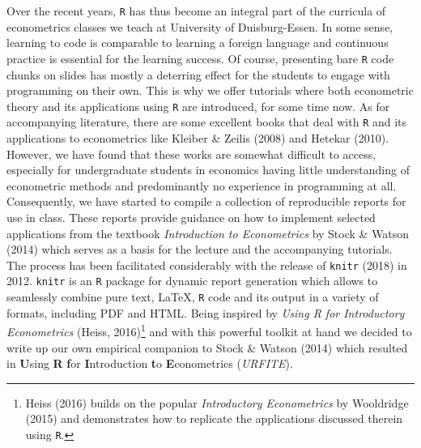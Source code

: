 \documentclass[]{book}
\let\rmarkdownfootnote\footnote%
\def\footnote{\protect\rmarkdownfootnote}
\theoremstyle{definition}
\theoremstyle{definition}
\theoremstyle{definition}
\theoremstyle{remark}
\begin{document}
Over the recent years, \texttt{R} has thus become an integral part of
the curricula of econometrics classes we teach at University of
Duisburg-Essen. In some sense, learning to code is comparable to
learning a foreign language and continuous practice is essential for the
learning success. Of course, presenting bare \texttt{R} code chunks on
slides has mostly a deterring effect for the students to engage with
programming on their own. This is why we offer tutorials where both
econometric theory and its applications using \texttt{R} are introduced,
for some time now. As for accompanying literature, there are some
excellent books that deal with \texttt{R} and its applications to
econometrics like Kleiber \& Zeilis (2008) and Hetekar (2010). However,
we have found that these works are somewhat difficult to access,
especially for undergraduate students in economics having little
understanding of econometric methods and predominantly no experience in
programming at all. Consequently, we have started to compile a
collection of reproducible reports for use in class. These reports
provide guidance on how to implement selected applications from the
textbook \emph{Introduction to Econometrics} by Stock \& Watson (2014)
which serves as a basis for the lecture and the accompanying tutorials.
The process has been facilitated considerably with the release of
\texttt{knitr} (2018) in 2012. \texttt{knitr} is an \texttt{R} package
for dynamic report generation which allows to seamlessly combine pure
text, LaTeX, \texttt{R} code and its output in a variety of formats,
including PDF and HTML. Being inspired by \emph{Using R for Introductory
Econometrics} (Heiss, 2016)\footnote{Heiss (2016) builds on the popular
  \emph{Introductory Econometrics} by Wooldridge (2015) and demonstrates
  how to replicate the applications discussed therein using \texttt{R}.}
and with this powerful toolkit at hand we decided to write up our own
empirical companion to Stock \& Watson (2014) which resulted in
\textbf{U}sing \textbf{R} \textbf{f}or \textbf{I}ntroduction \textbf{t}o
\textbf{E}conometrics (\emph{URFITE}).
\end{document}

